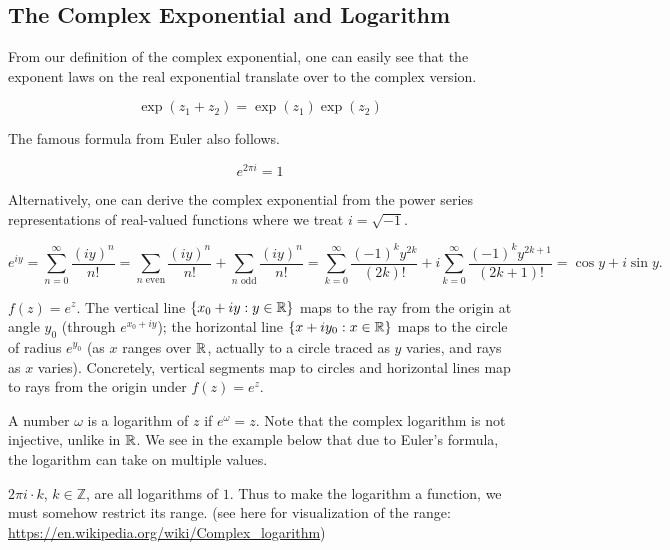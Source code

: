 \documentclass[11pt]{article}
\begin{document}
\subsection{The Complex Exponential and Logarithm}

From our definition of the complex exponential, one can easily see that the exponent laws on the real exponential translate over to the complex version.
\begin{proposition}
    \[
    \exp(z_1+z_2) = \exp(z_1)\exp(z_2)
    \]
\end{proposition}

The famous formula from Euler also follows.

\begin{proposition}
    \[e^{2\pi i} = 1\]
\end{proposition}

Alternatively, one can derive the complex exponential from the power series representations of real-valued functions where we treat $i =\sqrt{-1}$. 

\[
e^{iy} = \sum_{n=0}^\infty \frac{(iy)^n}{n!} = \sum_{n \text{ even}} \frac{(iy)^n}{n!} + \sum_{n \text{ odd}} \frac{(iy)^n}{n!} = \sum_{k=0}^\infty \frac{(-1)^k y^{2k}}{(2k)!} + i\sum_{k=0}^\infty \frac{(-1)^k y^{2k+1}}{(2k+1)!} = \cos y + i \sin y.
\]

\begin{example}
$f(z) = e^z$. The vertical line $\{x_0+iy : y \in {\mathbb{R}}\}$ maps to the ray from the origin at angle $y_0$ (through $e^{x_0+iy}$); the horizontal line $\{x+iy_0 : x \in {\mathbb{R}}\}$ maps to the circle of radius $e^{y_0}$ (as $x$ ranges over ${\mathbb{R}}$, actually to a circle traced as $y$ varies, and rays as $x$ varies). Concretely, vertical segments map to circles and horizontal lines map to rays from the origin under $f(z) = e^z$.
\end{example}

\begin{definition}
    [Logarithm]
    A number $\omega$ is a logarithm of $z$ if $e^\omega = z$. Note that the complex logarithm is not injective, unlike in ${\mathbb{R}}$. We see in the example below that due to Euler's formula, the logarithm can take on multiple values.
\end{definition}

\begin{example}
$2\pi i \cdot k$, $k \in \mathbb{Z}$, are all logarithms of $1$. Thus to make the logarithm a function, we must somehow restrict its range. (see here for visualization of the range: \url{https://en.wikipedia.org/wiki/Complex_logarithm})
\end{example}
\end{document}
